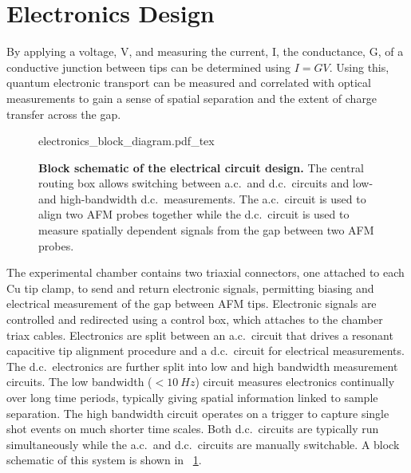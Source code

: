 \documentclass{article}
\begin{document}
\section{Electronics Design}
\label{sec:electronic_design}

By applying a voltage, \gls{V}, and measuring the current, \gls{I}, the conductance, \gls{G}, of a conductive junction between tips can be determined using $I=GV$. Using this, quantum electronic transport can be measured and correlated with optical measurements to gain a sense of spatial separation and the extent of charge transfer across the gap. %

\begin{figure}[bt]
\centering
\fontsize{10pt}{1em}\selectfont
{electronics_block_diagram.pdf_tex}
\caption[Block schematic of the electrical circuit design.]{\textbf{Block schematic of the electrical circuit design.} The central routing box allows switching between a.c.\ and d.c.\ circuits and low- and high-bandwidth d.c.\ measurements. The a.c.\ circuit is used to align two AFM probes together while the d.c.\ circuit is used to measure spatially dependent signals from the gap between two AFM probes.}
\label{fig:block_circuit_design}
\end{figure}

The experimental chamber contains two triaxial connectors, one attached to each Cu tip clamp, to send and return electronic signals, permitting biasing and electrical measurement of the gap between AFM tips. Electronic signals are controlled and redirected using a control box, which attaches to the chamber triax cables. Electronics are split between an a.c.\ circuit that drives a resonant capacitive tip alignment procedure and a d.c.\ circuit for electrical measurements. The d.c.\ electronics are further split into low and high bandwidth measurement circuits. The low bandwidth ($<\SI{10}{Hz}$) circuit measures electronics continually over long time periods, typically giving spatial information linked to sample separation. The high bandwidth circuit operates on a trigger to capture single shot events on much shorter time scales. Both d.c.\ circuits are typically run simultaneously while the a.c.\ and d.c.\ circuits are manually switchable. A block schematic of this system is shown in \figurename~\ref{fig:block_circuit_design}.
\end{document}

